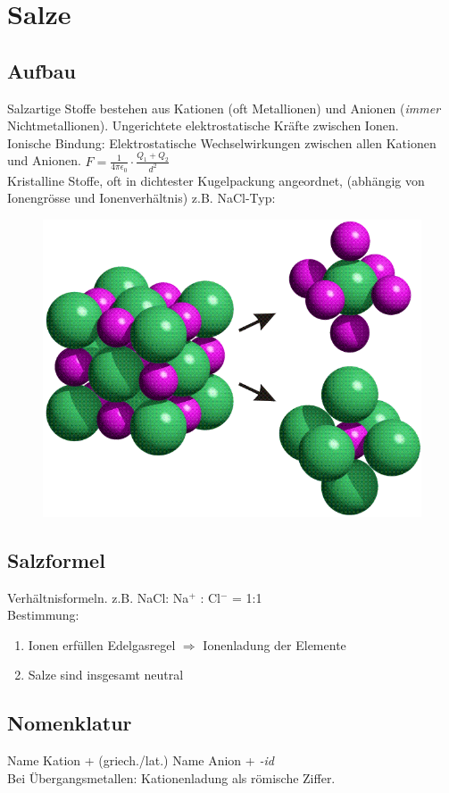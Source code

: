 \section{Salze}

\subsection{Aufbau}
Salzartige Stoffe bestehen aus Kationen (oft Metallionen) und Anionen (\emph{immer} Nichtmetallionen). Ungerichtete elektrostatische Kräfte zwischen Ionen.\\

Ionische Bindung: Elektrostatische Wechselwirkungen zwischen allen Kationen und Anionen. $F = \frac{1}{4 \pi \epsilon_0} \cdot \frac{Q_1 + Q_2}{d^2}$ \\

Kristalline Stoffe, oft in dichtester Kugelpackung angeordnet, (abhängig von Ionengrösse und Ionenverhältnis) z.B. NaCl-Typ:
\begin{figure}[htbp]
	\centering
	\includegraphics[width=0.5\linewidth]{images/5_Elementarzelle_NaCl.png}
\end{figure}

\subsection{Salzformel}
Verhältnisformeln. z.B. NaCl: Na$^+$ : Cl$^-$ = 1:1 \\

Bestimmung:
\begin{enumerate}
	\item Ionen erfüllen Edelgasregel $\Rightarrow$ Ionenladung der Elemente
	\item Salze sind insgesamt neutral
\end{enumerate}

\subsection{Nomenklatur}
Name Kation + (griech./lat.) Name Anion + \emph{-id} \\
Bei Übergangsmetallen: Kationenladung als römische Ziffer. \\

